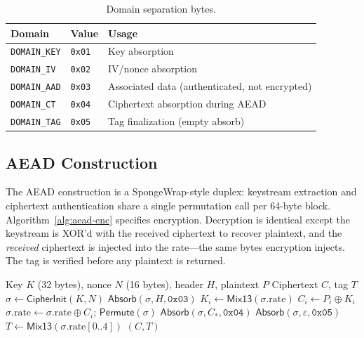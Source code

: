 \documentclass[runningheads]{llncs}
\begin{document}
\begin{table}[h]
\centering
\caption{Domain separation bytes.}
\label{tab:domains}
\begin{tabular}{@{}lll@{}}
\toprule
Domain & Value & Usage \\
\midrule
\texttt{DOMAIN\_KEY} & \texttt{0x01} & Key absorption \\
\texttt{DOMAIN\_IV}  & \texttt{0x02} & IV/nonce absorption \\
\texttt{DOMAIN\_AAD} & \texttt{0x03} & Associated data (authenticated, not encrypted) \\
\texttt{DOMAIN\_CT}  & \texttt{0x04} & Ciphertext absorption during AEAD \\
\texttt{DOMAIN\_TAG} & \texttt{0x05} & Tag finalization (empty absorb) \\
\bottomrule
\end{tabular}
\end{table}

\subsection{AEAD Construction}

The AEAD construction is a SpongeWrap-style duplex: keystream extraction and
ciphertext authentication share a single permutation call per 64-byte block.
Algorithm~\ref{alg:aead-enc} specifies encryption.
Decryption is identical except the keystream is XOR'd with the received
ciphertext to recover plaintext, and the \emph{received} ciphertext is
injected into the rate---the same bytes encryption injects.  The tag is
verified before any plaintext is returned.

\begin{algorithm}[t]
\caption{CATWALK duplex AEAD encryption (file format v10).}
\label{alg:aead-enc}
\begin{algorithmic}[1]
\Require Key $K$ (32 bytes), nonce $N$ (16 bytes),
         header $H$, plaintext $P$
\Ensure Ciphertext $C$, tag $T$
\State $\sigma \gets \mathsf{CipherInit}(K, N)$
\State $\mathsf{Absorb}(\sigma, H, \texttt{0x03})$
  \State $K_i \gets \mathsf{Mix13}(\sigma.\mathrm{rate})$
  \State $C_i \gets P_i \oplus K_i$
    \State $\sigma.\mathrm{rate} \gets \sigma.\mathrm{rate} \oplus C_i$;\;
           $\mathsf{Permute}(\sigma)$
  \EndIf
\EndFor
\State $\mathsf{Absorb}(\sigma, C_\ast, \texttt{0x04})$
\State $\mathsf{Absorb}(\sigma, \varepsilon, \texttt{0x05})$
\State $T \gets \mathsf{Mix13}(\sigma.\mathrm{rate}[0..4])$
\State \Return $(C, T)$
\end{algorithmic}
\end{algorithm}
\end{document}
